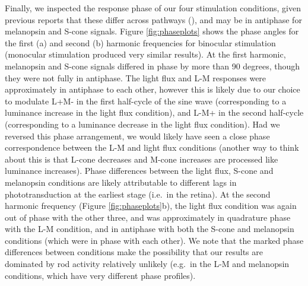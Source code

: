 \documentclass[
]{article}
\begin{document}
Finally, we inspected the response phase of our four stimulation conditions, given previous reports that these differ across pathways (), and may be in antiphase for melanopsin and S-cone signals. Figure \ref{fig:phaseplots} shows the phase angles for the first (a) and second (b) harmonic frequencies for binocular stimulation (monocular stimulation produced very similar results). At the first harmonic, melanopsin and S-cone signals differed in phase by more than 90 degrees, though they were not fully in antiphase. The light flux and L-M responses were approximately in antiphase to each other, however this is likely due to our choice to modulate L+M- in the first half-cycle of the sine wave (corresponding to a luminance increase in the light flux condition), and L-M+ in the second half-cycle (corresponding to a luminance decrease in the light flux condition). Had we reversed this phase arrangement, we would likely have seen a close phase correspondence between the L-M and light flux conditions (another way to think about this is that L-cone decreases and M-cone increases are processed like luminance increases). Phase differences between the light flux, S-cone and melanopsin conditions are likely attributable to different lags in phototransduction at the earliest stage (i.e.~in the retina). At the second harmonic frequency (Figure \ref{fig:phaseplots}b), the light flux condition was again out of phase with the other three, and was approximately in quadrature phase with the L-M condition, and in antiphase with both the S-cone and melanopsin conditions (which were in phase with each other). We note that the marked phase differences between conditions make the possibility that our results are dominated by rod activity relatively unlikely (e.g.~in the L-M and melanopsin conditions, which have very different phase profiles).
\end{document}
